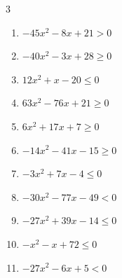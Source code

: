 \begin{multicols}{3}
\begin{enumerate}

  \item $-45x^{2}-8x+21>0$


  \item $-40x^{2}-3x+28\geq 0$


  \item $12x^{2}+x-20\leq 0$


\columnbreak %

\resetques

  \item $63x^{2}-76x+21\geq 0$


  \item $6x^{2}+17x+7\geq 0$


  \item $-14x^{2}-41x-15\geq 0$


  \item $-3x^{2}+7x-4\leq 0$


  \item $-30x^{2}-77x-49<0$


  \item $-27x^{2}+39x-14\leq 0$


  \item $-x^{2}-x+72\leq 0$

        \phantom{$\displaystyle x \leqq -9 , \; 8 \leqq x$}

  \item $-27x^{2}-6x+5<0$



\end{enumerate}
\end{multicols}
